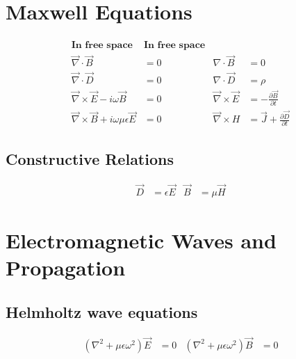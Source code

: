 \documentclass[a4paper, 11pt, landscape]{article}
\begin{document}
\setlength{\abovedisplayskip}{0pt}
\setlength{\belowdisplayskip}{0pt}
\setlength{\abovedisplayshortskip}{0pt}
\setlength{\belowdisplayshortskip}{0pt}

\begin{multicols*}{3}

\section{Maxwell Equations}
\begin{compactenum}

    \begin{align*}
    \textbf{In free space} & \textbf{In free space} \\
    \vec{\nabla} \cdot \vec{B} &= 0 & \nabla \cdot \vec{B} &= 0 \\
    \vec{\nabla} \cdot \vec{D} &= 0 & \nabla \cdot \vec{D} &= \rho \\
    \vec{\nabla} \times \vec{E} - i\omega\vec{B} &= 0 & 
    \vec{\nabla} \times \vec{E} &= - \frac{\partial \vec{B}}{\partial t} \\
    \vec{\nabla} \times \vec{B} + i\omega\mu\epsilon\vec{E} &= 0 & 
    \vec{\nabla} \times H &= \vec{J} + \frac{\partial \vec{D}}{\partial t}
	\end{align*}

\end{compactenum}

\subsection{Constructive Relations}
\begin{compactenum}

	\begin{align*}
	\vec{D} &= \epsilon\vec{E} & \vec{B} &= \mu\vec{H}
	\end{align*}

\end{compactenum}

\section{Electromagnetic Waves and Propagation}
\subsection{Helmholtz wave equations}
\begin{compactenum}
\begin{align*}
(\nabla^{2} + \mu \epsilon \omega^{2})\vec{E} &= 0 & 
(\nabla^{2} + \mu \epsilon \omega^{2})\vec{B} &= 0 
\end{align*}
\end{compactenum}


\end{multicols*}
\end{document}

